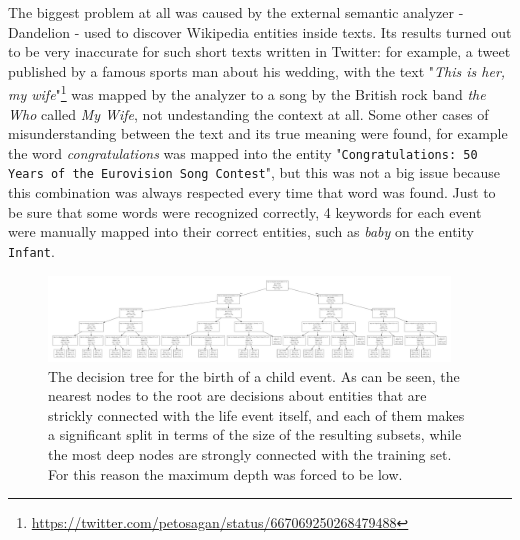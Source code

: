 The biggest problem at all was caused by the external semantic analyzer - Dandelion - used to discover Wikipedia entities inside texts. Its results turned out to be very inaccurate for such short texts written in Twitter: for example, a tweet published by a famous sports man about his wedding, with the text "\textit{This is her, my wife}"\footnote{\url{https://twitter.com/petosagan/status/667069250268479488}} was mapped by the analyzer to a song by the British rock band \textit{the Who} called \textit{My Wife}, not undestanding the context at all. Some other cases of misunderstanding between the text and its true meaning were found, for example the word \textit{congratulations} was mapped into the entity "\texttt{Congratulations: 50 Years of the Eurovision Song Contest}", but this was not a big issue because this combination was always respected every time that word was found. Just to be sure that some words were recognized correctly, 4 keywords for each event were manually mapped into their correct entities, such as \textit{baby} on the entity \texttt{Infant}.

\begin{figure}
\centering
\includegraphics[width=%
0.95\textwidth]{img/decisiontree}
\caption{The decision tree for the birth of a child event. As can be seen, the nearest nodes to the root are decisions about entities that are strickly connected with the life event itself, and each of them makes a significant split in terms of the size of the resulting subsets, while the most deep nodes are strongly connected with the training set. For this reason the maximum depth was forced to be low.}
\label{fig:decisiontree}
\end{figure}

